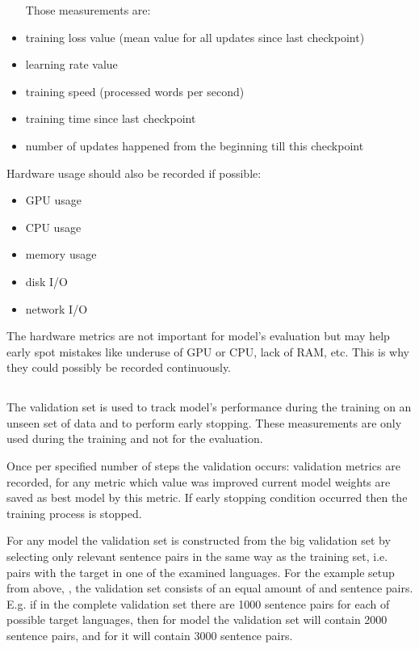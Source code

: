 \begin{samepage}
\begin{itemize}
	\item [Those measurements are:]
	\item training loss value (mean value for all updates since
	last checkpoint)
	\item learning rate value
	\item training speed (processed words per second)
	\item training time since last checkpoint
	\item number of updates happened from the beginning till this checkpoint
\end{itemize}
\end{samepage}
\begin{samepage}
Hardware usage should also be recorded if possible:
\begin{itemize}
	\item GPU usage
	\item CPU usage
	\item memory usage
	\item disk I/O
	\item network I/O
\end{itemize}
\end{samepage}

The hardware metrics are not important for model's evaluation
but may help early spot mistakes like underuse of GPU or CPU, lack of RAM, etc.
This is why they could possibly be recorded continuously. 

\subsection{}
\label{subsection:validation}

The validation set is used to track model's performance during the training
on an unseen set of data and to perform early stopping.
These measurements are only used during the training and not for the evaluation.

Once per specified number of steps the validation occurs:
validation metrics are recorded, for any metric which value was
improved current model weights are saved as best model by this metric.
If early stopping condition occurred then the training process is stopped.

For any model the validation set is constructed from the big validation set
by selecting only relevant sentence pairs in the same way as the training set,
i.e. pairs with the target in one of the examined languages.
For the example setup from above, , the validation set
consists of an equal amount of  and  sentence pairs.
E.g. if in the complete validation set there are 1000 sentence pairs for
each of possible target languages, then for 
model the validation set will contain 2000 sentence pairs, and for
 it will contain 3000 sentence pairs.

